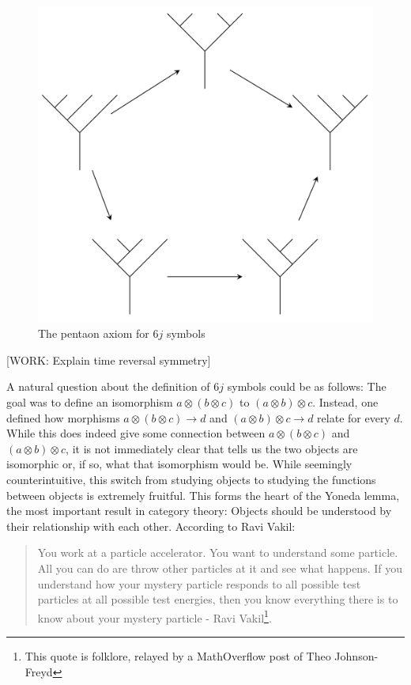 \documentclass{article}
\theoremstyle{definition}
\numberwithin{figure}{section}
\begin{document}
\begin{figure}
\begin{center}
\includegraphics[scale=0.28]{pentagon}
\caption{The pentaon axiom for $6j$ symbols}
\label{fig:pentagon}
\end{center}
\end{figure}


[WORK: Explain time reversal symmetry]

A natural question about the definition of $6j$ symbols could be as follows: The goal was to define an isomorphism $a\otimes (b\otimes c)$ to $(a\otimes b)\otimes c$. Instead, one defined how morphisms $a\otimes (b\otimes c)\to d$
 and $(a\otimes b)\otimes c\to d$ relate for every $d$. While this does indeed give some connection between $a\otimes (b\otimes c)$ and $(a\otimes b)\otimes c$, it is not immediately clear that tells us the two objects are isomorphic or, if so, what that isomorphism would be. While seemingly counterintuitive, this switch from studying objects to studying the functions between objects is extremely fruitful. This forms the heart of the Yoneda lemma, the most important result in category theory: Objects should be understood by their relationship with each other. According to Ravi Vakil:

\begin{quote}
You work at a particle accelerator. You want to understand some particle. All you can do are throw other particles at it and see what happens. If you understand how your mystery particle responds to all possible test particles at all possible test energies, then you know everything there is to know about your mystery particle - Ravi Vakil\footnote{This quote is folklore, relayed by a MathOverflow post of Theo Johnson-Freyd}.
\end{quote}
\end{document}
